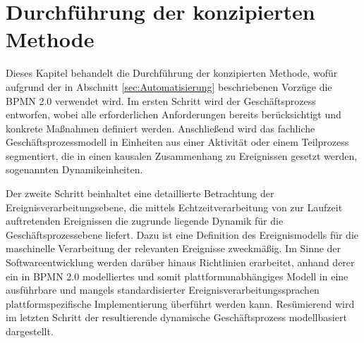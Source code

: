 \chapter{Durchführung der konzipierten Methode}\label{ch:Durchfuehrung}
Dieses Kapitel behandelt die Durchführung der konzipierten Methode, wofür aufgrund der in Abschnitt \ref{sec:Automatisierung} beschriebenen Vorzüge die BPMN 2.0 verwendet wird.
Im ersten Schritt wird der Geschäftsprozess entworfen, wobei alle erforderlichen Anforderungen bereits berücksichtigt und konkrete Maßnahmen definiert werden. 
Anschließend wird das fachliche Geschäftsprozessmodell in Einheiten aus einer Aktivität oder einem Teilprozess segmentiert, die in einen kausalen Zusammenhang zu Ereignissen gesetzt werden, sogenannten Dynamikeinheiten. 

Der zweite Schritt beinhaltet eine detaillierte Betrachtung der Ereignisverarbeitungsebene, die mittels Echtzeitverarbeitung von zur Laufzeit auftretenden Ereignissen die zugrunde liegende Dynamik für die Geschäftsprozessebene liefert. 
Dazu ist eine Definition des Ereignismodells für die maschinelle Verarbeitung der relevanten Ereignisse zweckmäßig. 
Im Sinne der Softwareentwicklung werden darüber hinaus Richtlinien erarbeitet, anhand derer ein in BPMN 2.0 modelliertes und somit plattformunabhängiges Modell in eine ausführbare und mangels standardisierter Ereignisverarbeitungssprachen plattformspezifische Implementierung überführt werden kann.
Resümierend wird im letzten Schritt der resultierende dynamische Geschäftsprozess modellbasiert dargestellt.



